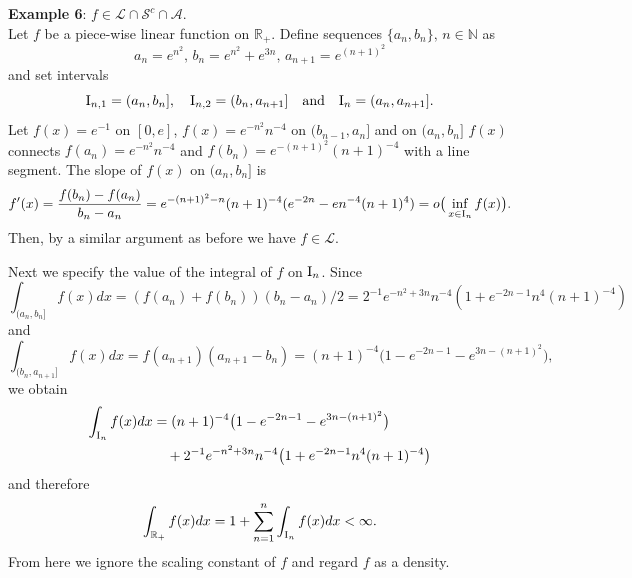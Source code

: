 \documentclass[12pt,leqno]{amsart}
\newcommand{\rI}{{\rm I}}
\newcommand{\N}{\mathbb{N}}
\newcommand{\R}{\mathbb{R}}
\newcommand{\cals}{{\mathcal S}}
\newcommand{\call}{{\mathcal L}}
\newcommand{\cala}{{\mathcal A}}
\newcommand{\1}{{\mathbf 1}}
\begin{document}
\noindent
{\bf Example 6}: $f\in \call \cap \cals^c \cap \cala $. \\
Let $f$ be a piece-wise linear function on $\R_+$. 
Define sequences $\{a_n,b_n\},\,n\in \N$ as 
\[
 a_n=e^{n^2},\, b_n=e^{n^2}+e^{3n},\, a_{n+1}=e^{(n+1)^2}
\]
and set intervals 
\[
 \rI_{n,1}=(a_n,b_n],\quad \rI_{n,2}=(b_n,a_{n+1}]\quad \text{and}\quad \rI_n=(a_n,a_{n+1}].
\]
Let $f(x)=e^{-1}$ on $[0,e]$, $f(x)=e^{-n^2}n^{-4}$ on $(b_{n-1},a_n]$ and on $(a_n,b_n]$ 
$f(x)$ connects $f(a_n)=e^{-n^2}n^{-4}$ and $f(b_n)=e^{-(n+1)^2}(n+1)^{-4}$ with a line segment.
The slope of $f(x)$ on $(a_n,b_n]$ is 
\begin{align*}
 f'(x) = \frac{f(b_n)-f(a_n)}{b_n-a_n} = 
e^{-(n+1)^2 - n}(n+1)^{-4}(e^{-2n} -e n^{-4}(n+1)^{4}) = o\big(\inf_{x\in \rI_n}f(x)\big).   
\end{align*}
Then, by a similar argument as before we have $f\in \call$.


Next we specify the value of the integral of 
$f$ on $\rI_n$. Since %
\[
 \int_{(a_n,b_n]}f(x) dx = (f(a_n)+f(b_n)) (b_n-a_n)/2 = 2^{-1} e^{-n^2+3n} n^{-4}(1+e^{-2n-1}n^4(n+1)^{-4}) 
\]
and 
\[
 \int_{(b_n,a_{n+1}]} f(x)dx = 
f(a_{n+1}) (a_{n+1}-b_n)=
(n+1)^{-4}\big(
1-e^{-2n-1}-e^{3n -(n+1)^2}
\big),
\]
we obtain
\begin{align}
\label{integral:I_n:third}
 \int_{\rI_n} f(x)dx &=(n+1)^{-4}\big(
1-e^{-2n-1}-e^{3n -(n+1)^2}\big) \\
 &\quad +2^{-1} e^{-n^2+3n} n^{-4}\big(1+e^{-2n-1}n^4(n+1)^{-4}\big) \nonumber
\end{align}
and therefore 
\[
 \int_{\R_+}f(x)dx = 1+ \sum_{n=1}^n \int_{\rI_n}f(x)dx <\infty.
\]
From here we ignore the scaling constant of $f$ and 
regard $f$ as a density.
\end{document}
